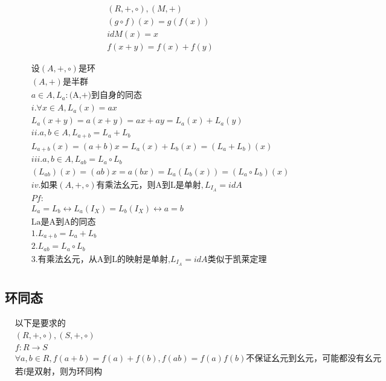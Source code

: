 \documentclass[12pt, a4paper]{article}  %
\begin{document}
\begin{align}
    &(R,+,\circ),(M,+)\\
    &(g\circ f)(x)=g(f(x))\\
    &idM(x)=x\\
    &f(x+y)=f(x)+f(y)
\end{align}


\begin{align}
    &\text{设}(A,+,\circ)\text{是环}\\
    &(A,+)\text{是半群}\\
    &a\in A,L_a:\text{(A,+)到自身的同态}\\
    &i. \forall x\in A,L_a(x)=ax\\
    &L_a(x+y)=a(x+y)=ax+ay=L_a(x)+L_a(y)\\
    &ii.a,b\in A,L_{a+b}=L_a+L_b\\
    &L_{a+b}(x)=(a+b)x=L_a(x)+L_b(x)=(L_a+L_b)(x)\\
    &iii. a,b\in A,L_{ab}=L_a\circ L_b\\
    &(L_{ab})(x)=(ab)x=a(bx)=L_a(L_b(x))=(L_a\circ L_b)(x)\\
    &iv. \text{如果}(A,+,\circ)\text{有乘法幺元，则A到L是单射},L_{I_A}=idA\\
    &Pf:\\
    &L_a=L_b\leftrightarrow L_a(I_X)=L_b(I_X)\leftrightarrow a=b\\
    &\text{La是A到A的同态}\\
    &1.L_{a+b}=L_a+L_b\\
    &2.L_{ab}=L_a\circ L_b\\
    &3.\text{有乘法幺元，从A到L的映射是单射,}L_{I_A}=idA\text{类似于凯莱定理}\\
\end{align}



\subsection{环同态}
\begin{align}
    &\text{以下是要求的}\\
    & (R,+,\circ),(S,+,\circ)\\
    &f:R\rightarrow S\\
    &\forall a,b\in R,f(a+b)=f(a)+f(b),f(ab)=f(a)f(b)\text{不保证幺元到幺元，可能都没有幺元}\\
    &\text{若f是双射，则为环同构}
\end{align}
\end{document}
